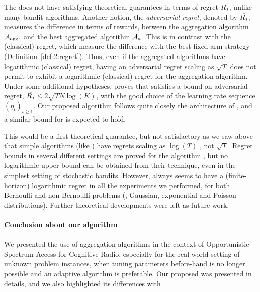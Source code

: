 The \Aggr{} does not have satisfying theoretical guarantees in terms of regret $R_T$, unlike many bandit algorithms.
%
Another notion, the \emph{adversarial regret}, denoted by $\overline{R_T}$,
measures the difference in terms of rewards,
between the aggregation algorithm $\mathcal{A}_{\mathrm{aggr}}$ and the best aggregated algorithm $\mathcal{A}_a$. This is in contrast with the (classical) regret, which measure the difference with the best fixed-arm strategy (Definition~\ref{def:2:regret}).
Thus, even if the aggregated algorithms have logarithmic (classical) regret, having an adversarial regret scaling as $\sqrt{T}$ does not permit to exhibit a logarithmic (classical) regret for the aggregation algorithm.
%
%
Under some additional hypotheses,
\cite[Theorem 4.2]{Bubeck12} proves that
\ExpQ{} satisfies a bound on adversarial regret, %
$\overline{R_T} \leq 2 \sqrt{T N \log(K)}$,
with the good choice of the learning rate sequence $(\eta_t)_{t \geq 1}$.
Our proposed algorithm follows quite closely the architecture of \ExpQ,
and a similar bound for \Aggr{} is expected to hold.
%

This would be a first theoretical guarantee, but not satisfactory as we saw above that simple algorithms (like \UCB) have regrets scaling as $\log(T)$ \cite{Auer02,Bubeck12}, not $\sqrt{T}$.
%
Regret bounds in several different settings are proved for the \CORRAL{} algorithm \cite{Agarwal16}, but no logarithmic upper-bound can be obtained from their technique, even in the simplest setting of stochastic bandits.
%
However, \Aggr{} always seems to have a (finite-horizon) logarithmic regret in all the experiments we performed,
for both Bernoulli and non-Bernoulli problems (\eg, Gaussian, exponential and Poisson distributions).
Further theoretical developments were left as future work.



\paragraph{Conclusion about our \Aggr{} algorithm}\label{sub:25:conclusion}

We presented the use of aggregation algorithms in the context of Opportunistic Spectrum Access for Cognitive Radio,
especially for the real-world setting of unknown problem instances,
when tuning parameters before-hand is no longer possible and an adaptive algorithm is preferable.
Our proposed \Aggr{} was presented in details,
and we also highlighted its differences with \ExpQ.

